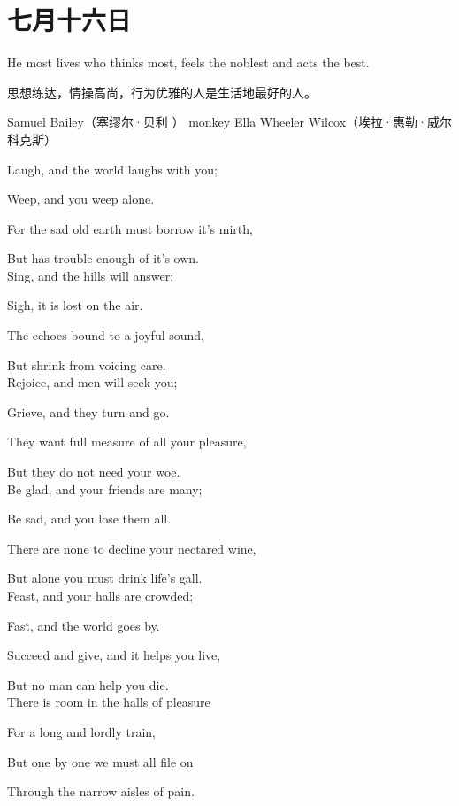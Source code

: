 \section{七月十六日}
\dailyquote
{He most lives who thinks most, feels the noblest and acts the best. 

思想练达，情操高尚，行为优雅的人是生活地最好的人。}
{Samuel Bailey（塞缪尔·贝利 ）}
{monkey}
{Ella Wheeler Wilcox（埃拉·惠勒·威尔科克斯）}
{Laugh, and the world laughs with you;
	
	Weep, and you weep alone.
	
	For the sad old earth must borrow it's mirth,
	
	But has trouble enough of it's own.\\
	
	
	Sing, and the hills will answer;
	
	Sigh, it is lost on the air.
	
	The echoes bound to a joyful sound,
	
	But shrink from voicing care.\\
	
	
	Rejoice, and men will seek you;
	
	Grieve, and they turn and go.
	
	They want full measure of all your pleasure,
	
	But they do not need your woe.\\
	
	
	Be glad, and your friends are many;
	
	Be sad, and you lose them all.
	
	There are none to decline your nectared wine,
	
	But alone you must drink life's gall.\\
	
	
	Feast, and your halls are crowded;
	
	Fast, and the world goes by.
	
	Succeed and give, and it helps you live,
	
	But no man can help you die.\\
	
	
	There is room in the halls of pleasure
	
	For a long and lordly train,
	
	But one by one we must all file on
	
	Through the narrow aisles of pain.}
